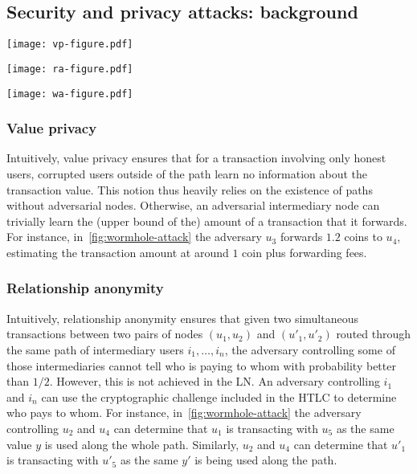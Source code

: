 \subsection{Security and privacy attacks: background}

\begin{figure*}[tb]
	\texttt{[image: vp-figure.pdf]}
	
	\vspace{0.3cm}
	
	\texttt{[image: ra-figure.pdf]}
	
	\vspace{0.3cm}
	
	\texttt{[image: wa-figure.pdf]}
	
	\caption{\label{fig:wormhole-attack} An illustrative example of value privacy (top), relationship anonymity (middle), and the wormhole attack (bottom).}
\end{figure*}

\subsubsection{Value privacy~\cite{Malavolta2017}}
Intuitively, value privacy ensures that for a transaction involving only honest users, 
corrupted users outside of the path learn no information about the transaction value.
This notion thus heavily relies on the existence of paths without adversarial nodes.  
Otherwise, an adversarial intermediary node can trivially learn the (upper bound of the) amount of a transaction that it forwards. 
For instance, in~\cref{fig:wormhole-attack} the adversary $u_3$
forwards $1.2$ coins to $u_4$, estimating the transaction amount at around $1$ coin plus forwarding fees.

\subsubsection{Relationship anonymity~\cite{Malavolta2017}}
Intuitively, relationship anonymity ensures that given two simultaneous transactions 
between two pairs of nodes $(u_1, u_2)$ and $(u'_1, u'_2)$ routed through the same path of intermediary 
users $i_1, \ldots, i_n$, the adversary controlling some of those intermediaries cannot tell who is paying to whom with probability better than $1/2$.
However, this is not achieved in the LN.
An adversary controlling $i_1$ and $i_n$ can use the cryptographic challenge included in the HTLC to 
determine who pays to whom.
For instance, in~\cref{fig:wormhole-attack} the adversary controlling $u_2$ 
and $u_4$ can determine that $u_1$ is transacting with $u_5$ as the same value $y$ is used along the whole path. 
Similarly, $u_2$ and $u_4$ can determine that $u'_1$ is transacting with $u'_5$ as the same $y'$ is being used along the path. 

